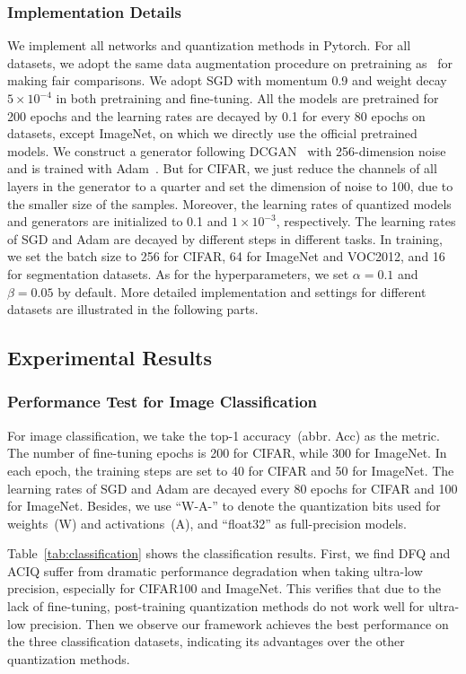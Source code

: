 \documentclass[final]{cvpr}
\begin{document}
\subsubsection{Implementation Details}
We implement all networks and quantization methods in Pytorch. For all datasets, we adopt the same data augmentation procedure on pretraining as~\cite{sandler2018mobilenetv2} for making fair comparisons. We adopt SGD with momentum 0.9 and weight decay $5\times10^{-4}$ in both pretraining and fine-tuning. All the models are pretrained for 200 epochs and the learning rates are decayed by 0.1 for every 80 epochs on datasets, except ImageNet, on which we directly use the official pretrained models. We construct a generator following DCGAN~\cite{radford2015unsupervised} with 256-dimension noise and is trained with Adam~\cite{kingma2014adam}. But for CIFAR, we just reduce the channels of all layers in the generator to a quarter and set the dimension of noise to 100, due to the smaller size of the samples. Moreover, the learning rates of quantized models and generators are initialized to 0.1 and $1\times10^{-3}$, respectively. The learning rates of SGD and Adam are decayed by different steps in different tasks. In training, we set the batch size to 256 for CIFAR, 64 for ImageNet and VOC2012, and 16 for segmentation datasets. As for the hyperparameters, we set $\alpha=0.1$ and $\beta=0.05$ by default. More detailed implementation and settings for different datasets are illustrated in the following parts. 


\subsection{Experimental Results}

\subsubsection{Performance Test for Image Classification} For image classification, we take the top-1 accuracy~(abbr. Acc) as the metric. 
The number of fine-tuning epochs is 200 for CIFAR, while 300 for ImageNet.
In each epoch, the training steps are set to 40 for CIFAR and 50 for ImageNet. 
The learning rates of SGD and Adam are decayed every 80 epochs for CIFAR and 100 for ImageNet.
Besides, we use ``W-A-'' to denote the quantization bits used for weights~(W) and activations~(A), and ``float32'' as full-precision models.

Table~\ref{tab:classification} shows the classification results.
First, we find DFQ and ACIQ suffer from dramatic performance degradation when taking ultra-low precision, especially for CIFAR100 and ImageNet.
This verifies that due to the lack of fine-tuning, post-training quantization methods do not work well for ultra-low precision.
Then we observe our framework achieves the best performance on the three classification datasets, indicating its advantages over the other quantization methods.
\end{document}
